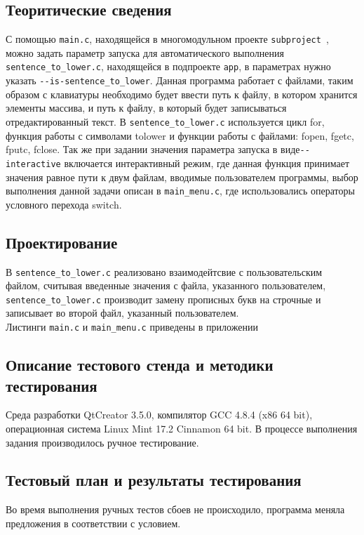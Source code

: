 \documentclass[12pt,a4paper]{report}
\begin{document}
\subsection{Теоритические сведения}
С помощью \verb+main.c+, находящейся в многомодульном проекте \verb+subproject +, можно задать параметр запуска для автоматического выполнения\\ 
\verb+sentence_to_lower.c+, находящейся в подпроекте \verb+app+, в параметрах нужно указать 
\verb+--is-sentence_to_lower+. Данная программа работает с файлами, таким образом с клавиатуры необходимо будет ввести путь к файлу, в котором хранится элементы массива, и путь к файлу, в который будет записываться отредактированный текст. В \verb+sentence_to_lower.c+ используется цикл for, функция работы с символами tolower и функции работы с файлами: fopen, fgetc,  fputc, fclose. Так же при задании значения параметра запуска в виде\verb+--interactive+ включается интерактивный режим, где данная функция принимает значения равное пути к двум файлам, вводимые пользователем программы, выбор выполнения данной задачи описан в \verb+main_menu.c+, где использовались операторы условного перехода switch.

\subsection{Проектирование}

В \verb+sentence_to_lower.c+  реализовано взаимодейтсвие с пользовательским файлом, считывая введенные значения с файла, указанного пользователем, \verb+sentence_to_lower.c+ производит замену прописных букв на строчные и записывает во второй файл, указанный пользователем.\\

Листинги \verb+main.c+ и \verb+main_menu.c+ приведены в приложении
\subsection{Описание тестового стенда и методики тестирования}
Среда разработки QtCreator 3.5.0, компилятор GCC 4.8.4 (x86 64 bit), операционная система Linux Mint 17.2 Cinnamon 64 bit.
В процессе выполнения задания производилось ручное тестирование.
\subsection{Тестовый план и результаты тестирования}
Во время выполнения ручных тестов сбоев не происходило, программа меняла предложения в соответствии с условием.
\end{document}
